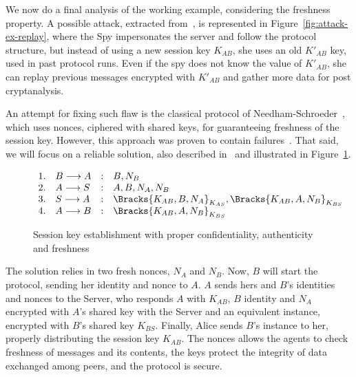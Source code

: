We now do a final analysis of the working example, considering the freshness property. A possible attack, extracted from~\cite{BoydMathuria2008}, is represented in Figure~\ref{fig:attack-ex-replay}, where the Spy impersonates the server and follow the protocol structure, but instead of using a new session key \(K_{AB}\), she uses an old \(K'_{AB}\) key, used in past protocol runs. Even if the spy does not know the value of \(K'_{AB}\), she can replay previous messages encrypted with \(K'_{AB}\) and gather more data for post cryptanalysis.

An attempt for fixing such flaw is the classical protocol of Needham-Schroeder~\cite{NeedhamSchroeder78}, which uses nonces, ciphered with shared keys, for guaranteeing freshness of the session key. However, this approach was proven to contain failures~\cite{Lowe96}. That said, we will focus on a reliable solution, also described in~\cite{BoydMathuria2008} and illustrated in Figure~\ref{prt:session-key-complete}.

\begin{figure}[ht]\label{prt:session-key-complete}
  \centering
  \[
    \begin{array}{rlcl}
      1. & B \longrightarrow A &:& B, N_B \\
      2. & A \longrightarrow S &:& A, B, N_A, N_B \\
      3. & S \longrightarrow A &:& \Bracks{K_{AB}, B, N_A}_{K_{AS}}, \Bracks{K_{AB}, A, N_B}_{K_{BS}} \\
      4. & A \longrightarrow B &:& \Bracks{K_{AB}, A, N_B}_{K_{BS}} \\
    \end{array}
  \]
  \caption{Session key establishment with proper confidentiality, authenticity and freshness}
\end{figure}

The solution relies in two fresh nonces, \(N_A\) and \(N_B\). Now, \(B\) will start the protocol, sending her identity and nonce to \(A\). \(A\) sends hers and \(B\)'s identities and nonces to the Server, who responds \(A\) with \(K_{AB}\), \(B\) identity and \(N_A\) encrypted with \(A\)'s shared key with the Server and an equivalent instance, encrypted with \(B\)'s shared key \(K_{BS}\). Finally, Alice sends \(B\)'s instance to her, properly distributing the session key \(K_{AB}\). The nonces allows the agents to check freshness of messages and its contents, the keys protect the integrity of data exchanged among peers, and the protocol is secure.





